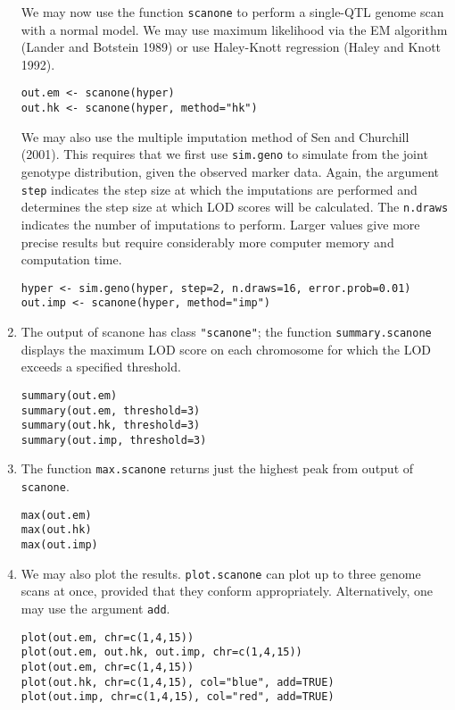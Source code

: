 \documentclass[10pt,letterpaper]{article}
\newcommand{\usercolor}{\color [named]{BlueViolet}}
\begin{document}
\begin{enumerate}
We may now use the function \verb-scanone- to perform a single-QTL
genome scan with a normal model.  We may use maximum likelihood via
the EM algorithm (Lander and Botstein 1989) or use Haley-Knott
regression (Haley and Knott 1992).

\usercolor
\verb|out.em <- scanone(hyper)| \\
\verb|out.hk <- scanone(hyper, method="hk")|
\normalcolor  

We may also use the multiple imputation method of Sen and Churchill
(2001).  This requires that we first use \verb-sim.geno- to simulate
from the joint genotype distribution, given the observed marker data.  
Again, the argument \verb-step- indicates the step size at which the
imputations are performed and determines the step size at which LOD
scores will be calculated.  The \verb-n.draws- indicates the number of
imputations to perform.  Larger values give more precise results but
require considerably more computer memory and computation time.

\usercolor
\verb|hyper <- sim.geno(hyper, step=2, n.draws=16, error.prob=0.01)| \\
\verb|out.imp <- scanone(hyper, method="imp")|
\normalcolor

\item The output of scanone has class
  \verb-"scanone"-; the function \verb-summary.scanone- displays the
  maximum LOD score on each chromosome for which the LOD exceeds a
  specified threshold.

\usercolor
\verb|summary(out.em)| \\
\verb|summary(out.em, threshold=3)| \\
\verb|summary(out.hk, threshold=3)| \\
\verb|summary(out.imp, threshold=3)| 
\normalcolor

\item The function \verb-max.scanone- returns just the highest peak
from output of \verb-scanone-.

\usercolor
\verb|max(out.em)| \\
\verb|max(out.hk)| \\
\verb|max(out.imp)| 
\normalcolor

\item We may also plot the results.  \verb-plot.scanone- can plot up
to three genome scans at once, provided that they conform
appropriately.  Alternatively, one may use the argument \verb-add-.

\usercolor
\verb|plot(out.em, chr=c(1,4,15))| \\
\verb|plot(out.em, out.hk, out.imp, chr=c(1,4,15))|  \\
\verb|plot(out.em, chr=c(1,4,15))| \\
\verb|plot(out.hk, chr=c(1,4,15), col="blue", add=TRUE)| \\
\verb|plot(out.imp, chr=c(1,4,15), col="red", add=TRUE)|
\normalcolor


\end{enumerate}
\end{document}
